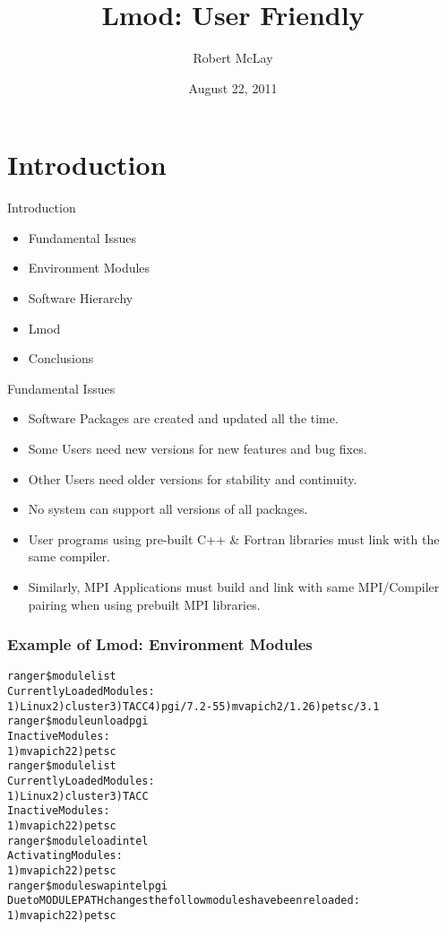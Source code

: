\documentclass{beamer}
\title{Lmod: User Friendly}
\author{Robert McLay}
\institute{The Texas Advanced Computing Center}
\date{August 22, 2011}  %
\begin{document}
\begin{frame}
  \titlepage
\end{frame}

\section{Introduction}

\begin{frame}{Introduction}
  \begin{itemize}
    \item Fundamental Issues
    \item Environment Modules
    \item Software Hierarchy
    \item Lmod
    \item Conclusions
  \end{itemize}
\end{frame}


\begin{frame}{Fundamental Issues}
  \begin{itemize}
    \item Software Packages are created and updated all the time.
    \item Some Users need new versions for new features and bug fixes.
    \item Other Users need older versions for stability and continuity.
    \item No system can support all versions of all packages.
    \item User programs using pre-built C++ \& Fortran libraries must
      link with the same compiler.
    \item Similarly, MPI Applications must build and link with same
      MPI/Compiler pairing when using prebuilt MPI libraries.
  \end{itemize}
\end{frame}

\begin{frame}[fragile]
    \frametitle{Example of Lmod: Environment Modules}
    {\tiny
\begin{alltt}
{\color{blue}ranger\$ module list}
Currently Loaded Modules:
  1) Linux  2) cluster  3) TACC  4) pgi/7.2-5  5) mvapich2/1.2  6) petsc/3.1
{\color{blue}ranger\$ module unload pgi}
Inactive Modules:
  1) mvapich2  2) petsc
{\color{blue}ranger\$ module list}
Currently Loaded Modules:
  1) Linux  2) cluster  3) TACC
Inactive Modules:
  1) mvapich2  2) petsc
{\color{blue}ranger\$ module load intel}
Activating Modules:
  1) mvapich2  2) petsc
{\color{blue}ranger\$ module swap intel pgi}
Due to MODULEPATH changes the follow modules have been reloaded:
  1) mvapich2  2) petsc
\end{alltt}
    }
\end{frame}
\end{document}
